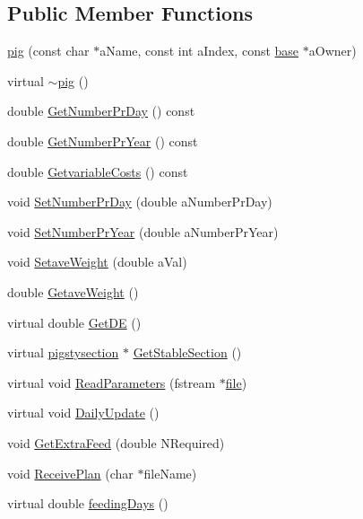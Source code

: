 \subsection*{Public Member Functions}
\begin{DoxyCompactItemize}
\item 
\hyperlink{classpig_a6da82d7be7f29bba53eb9cb1081091ca}{pig} (const char $\ast$aName, const int aIndex, const \hyperlink{classbase}{base} $\ast$aOwner)
\item 
virtual \hyperlink{classpig_a12bb73819ea97c7df4c7dba0cbcaa819}{$\sim$pig} ()
\item 
double \hyperlink{classpig_a907a151f7a0f59dd2c9b02da72ae43e9}{GetNumberPrDay} () const 
\item 
double \hyperlink{classpig_a39f938b4e819af79b288eadaf19e9f35}{GetNumberPrYear} () const 
\item 
double \hyperlink{classpig_aee9f42652f0f9a71fdcc5b65df555a97}{GetvariableCosts} () const 
\item 
void \hyperlink{classpig_abfc2a5b80d56f3e886e1e5649f3b9820}{SetNumberPrDay} (double aNumberPrDay)
\item 
void \hyperlink{classpig_a5ada344ee9223275a5dec61f71ce7bb4}{SetNumberPrYear} (double aNumberPrYear)
\item 
void \hyperlink{classpig_ab7ee804807152f9528421430af56e740}{SetaveWeight} (double aVal)
\item 
double \hyperlink{classpig_a27465927a51b581287c7e13e84c1c5c8}{GetaveWeight} ()
\item 
virtual double \hyperlink{classpig_aeb56ca7a77c1f27b7bc90ee4df0d4d1f}{GetDE} ()
\item 
virtual \hyperlink{classpigstysection}{pigstysection} $\ast$ \hyperlink{classpig_a2320d7f431264ffed833fc93182787bb}{GetStableSection} ()
\item 
virtual void \hyperlink{classpig_a43fbf15dc40e35fbfd5939c1748ff71b}{ReadParameters} (fstream $\ast$\hyperlink{classbase_a3af52ee9891719d09b8b19b42450b6f6}{file})
\item 
virtual void \hyperlink{classpig_ace82dae0cc5b75ed3051b145e12d1803}{DailyUpdate} ()
\item 
void \hyperlink{classpig_a08c3cb7e3cbffe06466eade9e044157e}{GetExtraFeed} (double NRequired)
\item 
void \hyperlink{classpig_a093788c67f8ab28b6e9da95bca443b89}{ReceivePlan} (char $\ast$fileName)
\item 
virtual double \hyperlink{classpig_a5ab403443122aaaeb16d82c5844b75f6}{feedingDays} ()

\end{DoxyCompactItemize}
